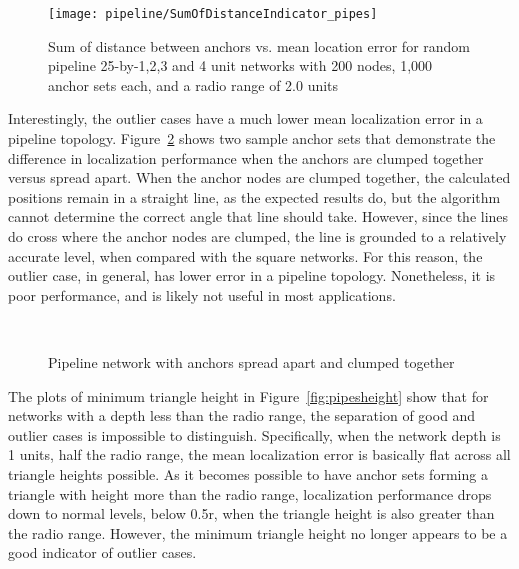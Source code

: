 \begin{figure}
  \centering
	\texttt{[image: pipeline/SumOfDistanceIndicator\_pipes]}
	\caption[Sum of distance between anchors vs. mean location error]{Sum of distance between anchors vs. mean location error for random pipeline 25-by-1,2,3 and 4 unit networks with 200 nodes, 1,000 anchor sets each, and a radio range of 2.0 units}
	\label{fig:pipessum}
\end{figure}

Interestingly, the outlier cases have a much lower mean localization error in a pipeline topology.  Figure~\ref{fig:pipesspread} shows two sample anchor sets that demonstrate the difference in localization performance when the anchors are clumped together versus spread apart.  When the anchor nodes are clumped together, the calculated positions remain in a straight line, as the expected results do, but the algorithm cannot determine the correct angle that line should take.  However, since the lines do cross where the anchor nodes are clumped, the line is grounded to a relatively accurate level, when compared with the square networks. For this reason, the outlier case, in general, has lower error in a pipeline topology. Nonetheless, it is poor performance, and is likely not useful in most applications.

\begin{figure}
  \centering
	\\
	\caption{Pipeline network with anchors spread apart and clumped together}
	\label{fig:pipesspread}
\end{figure}

The plots of minimum triangle height in Figure~\ref{fig:pipesheight} show that for networks with a depth less than the radio range, the separation of good and outlier cases is impossible to distinguish.  Specifically, when the network depth is 1 units, half the radio range, the mean localization error is basically flat across all triangle heights possible.  As it becomes possible to have anchor sets forming a triangle with height more than the radio range, localization performance drops down to normal levels, below 0.5r, when the triangle height is also greater than the radio range.  However, the minimum triangle height no longer appears to be a good indicator of outlier cases. 

